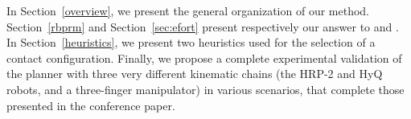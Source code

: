 In Section~\ref{overview}, we present the general organization of our method. Section~\ref{rbprm} and Section~\ref{sec:efort} present respectively our answer to  \Pa and \Pb. In Section~\ref{heuristics}, we present two heuristics used for the selection of  a contact configuration. Finally, we propose a complete experimental validation of the planner with three very different kinematic chains (the HRP-2 and HyQ robots, and a three-finger manipulator) in various scenarios,
that complete those presented in the conference paper.
